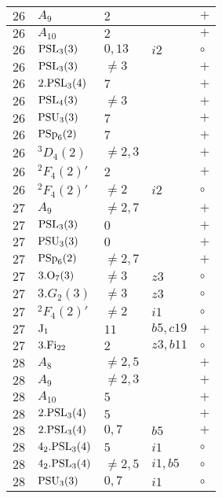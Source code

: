 \documentclass[a4paper, 11pt]{article}
\begin{document}
\begin{longtable}{lllll}
		$26$ & $A_{9}$ & $2$ & & $+$ \\ \hline
		$26$ & $A_{10}$ & $2$ & & $+$ \\ \hline
		$26$ & ${\rm PSL}_{3}(3)$ & $0,13$ & $i2$ & $\circ$ \\ \hline
		$26$ & ${\rm PSL}_{3}(3)$ & $\neq 3$ & & $+$ \\ \hline
		$26$ & $2.{\rm PSL}_{3}(4)$ & $7$ & & $+$ \\ \hline
		$26$ & ${\rm PSL}_{4}(3)$ & $\neq 3$ & & $+$ \\ \hline
		$26$ & ${\rm PSU}_{3}(3)$ & $7$ & & $+$ \\ \hline
		$26$ & ${\rm PSp}_{6}(2)$ & $7$ & & $+$ \\ \hline
		$26$ & ${}^3D_{4}(2)$ & $\neq 2,3$ & & $+$ \\ \hline
		$26$ & ${}^2F_4(2)'$ & $2$ & & $+$ \\ \hline
		$26$ & ${}^2F_4(2)'$ & $\neq 2$ & $i2$ & $\circ$ \\ \hline
		$27$ & $A_{9}$ & $\neq 2,7$ & & $+$ \\ \hline
		$27$ & ${\rm PSL}_{3}(3)$ & $0$ & & $+$ \\ \hline
		$27$ & ${\rm PSU}_{3}(3)$ & $0$ & & $+$ \\ \hline
		$27$ & ${\rm PSp}_{6}(2)$ & $\neq 2,7$ & & $+$ \\ \hline
		$27$ & $3.{\rm O}_{7}(3)$ & $\neq 3$ & $z3$ & $\circ$ \\ \hline
		$27$ & $3.G_{2}(3)$ & $\neq 3$ & $z3$ & $\circ$ \\ \hline
		$27$ & ${}^2F_4(2)'$ & $\neq 2$ & $i1$ & $\circ$ \\ \hline
		$27$ & ${\rm J}_1$ & $11$ & $b5, c19$ & $+$ \\ \hline
		$27$ & $3.{\rm Fi}_{22}$ & $2$ & $z3, b11$ & $\circ$ \\ \hline
		$28$ & $A_{8}$ & $\neq 2,5$ & & $+$ \\ \hline
		$28$ & $A_{9}$ & $\neq 2,3$ & & $+$ \\ \hline
		$28$ & $A_{10}$ & $5$ & & $+$ \\ \hline
		$28$ & $2.{\rm PSL}_{3}(4)$ & $5$ & & $+$ \\ \hline
		$28$ & $2.{\rm PSL}_{3}(4)$ & $0,7$ & $b5$ & $+$ \\ \hline
		$28$ & $4_2.{\rm PSL}_{3}(4)$ & $5$ & $i1$ & $\circ$ \\ \hline
		$28$ & $4_2.{\rm PSL}_{3}(4)$ & $\neq 2,5$ & $i1, b5$ & $\circ$ \\ \hline
		$28$ & ${\rm PSU}_{3}(3)$ & $0,7$ & $i1$ & $\circ$ \\ \hline

\end{longtable}
\end{document}
